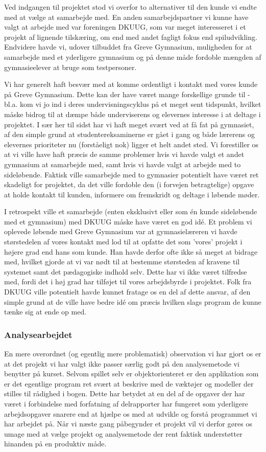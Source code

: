 \documentclass[10pt,a4paper,danish]{article}
\begin{document}
Ved indgangen til projektet stod vi overfor to alternativer til den kunde vi endte med
at vælge at samarbejde med. En anden samarbejdspartner vi kunne have valgt at arbejde med
var foreningen DKUUG, som var meget interesseret i et projekt af lignende tilskæring, om end
med andet fagligt fokus end spiludvikling. Endvidere havde vi, udover tilbuddet fra Greve
Gymnasium, muligheden for at samarbejde med et yderligere gymnasium og på denne måde fordoble
mængden af gymnasieelever at bruge som testpersoner. 

Vi har generelt haft besvær med at komme ordentligt i kontakt med vores kunde på Greve Gymnasium. 
Dette kan der have været mange forskellige grunde til - bl.a. kom vi jo ind i deres undervisningscyklus
på et meget sent tidspunkt, hvilket måske bidrog til at dæmpe både underviserens og elevernes 
interesse i at deltage i projektet. I sær her til sidst har vi haft meget svært ved at få fat
på gymnasiet, af den simple grund at studentereksaminerne er gået i gang og både lærerens og
elevernes prioriteter nu (forståeligt nok) ligger et helt andet sted. Vi forestiller os at vi ville
have haft præcis de samme problemer hvis vi havde valgt et andet gymnasium at samarbejde med, samt 
hvis vi havde valgt at arbejde med to sideløbende. Faktisk ville samarbejde med to gymnasier potentielt
have været ret skadeligt for projektet, da det ville fordoble den (i forvejen betragtelige) opgave 
at holde kontakt til kunden, informere om fremskridt og deltage i løbende møder. 

I retrospekt ville et samarbejde (enten eksklusivt eller som én kunde sideløbende med et gymnasium) med 
DKUUG måske have været en god idé. Et problem vi oplevede løbende med Greve Gymnasium var at gymnasielæreren
vi havde størstedelen af vores kontakt med lod til at opfatte det som 'vores' projekt i højere grad end 
hans som kunde. Han havde derfor ofte ikke så meget at bidrage med, hvilket gjorde at vi var nødt til at
bestemme størsteden af kravene til systemet samt det pædagogiske indhold selv. Dette har vi ikke været tilfredse
med, fordi det i høj grad har tilføjet til vores arbejdsbyrde i projektet. Folk fra DKUUG ville potentielt
havde kunnet fratage os en del af dette ansvar, af den simple grund at de ville have bedre idé om præcis
hvilken slags program de kunne tænke sig at ende op med. 

\subsubsection{Analysearbejdet}
En mere overordnet (og egentlig mere problematisk) observation vi har gjort os er at det projekt vi 
har valgt ikke passer særlig godt på den analysemetode vi benytter på kurset. Selvom spillet selv 
er objektorienteret er den applikation som er det egentlige program ret svært at beskrive med de 
væktøjer og modeller der stilles til rådighed i bogen. Dette har betydet at en del af de opgaver der
har været i forbindelse med forfatning af delrapporter har fungeret som yderligere arbejdsopgaver
snarere end at hjælpe os med at udvikle og forstå programmet vi har arbejdet på. Når vi næste gang
påbegynder et projekt vil vi derfor gøres os umage med at vælge projekt og analysemetode der rent 
faktisk understøtter hinanden på en produktiv måde. 
\end{document}
